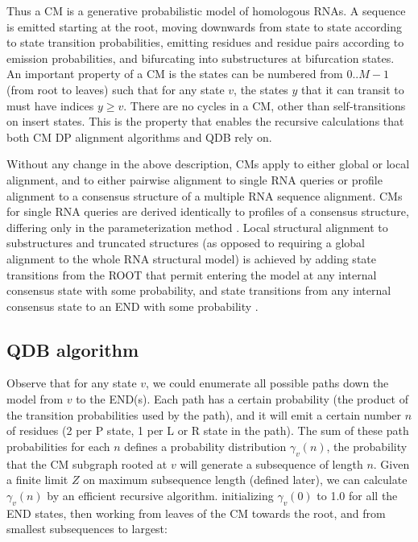 \documentclass[11pt]{article}
\begin{document}
Thus a CM is a generative probabilistic model of homologous RNAs.  A
sequence is emitted starting at the root, moving downwards from state
to state according to state transition probabilities, emitting
residues and residue pairs according to emission probabilities, and
bifurcating into substructures at bifurcation states. An important
property of a CM is the states can be numbered from $0..M-1$ (from root
to leaves) such that for any state $v$, the states $y$ that it can
transit to must have indices $y \geq v$. There are no cycles in a
CM, other than self-transitions on insert states.  This is the
property that enables the recursive calculations that both CM DP
alignment algorithms and QDB rely on.

Without any change in the above description, CMs apply to either
global or local alignment, and to either pairwise alignment to single
RNA queries or profile alignment to a consensus structure of a
multiple RNA sequence alignment. CMs for single RNA queries are
derived identically to profiles of a consensus structure, differing
only in the parameterization method \cite{KleinEddy03}. Local
structural alignment to substructures and truncated structures (as
opposed to requiring a global alignment to the whole RNA structural
model) is achieved by adding state transitions from the ROOT that
permit entering the model at any internal consensus state with some
probability, and state transitions from any internal consensus state 
to an END with some probability \cite{KleinEddy03}.

\subsection{QDB algorithm}

Observe that for any state $v$, we could enumerate all possible paths
down the model from $v$ to the END(s). Each path has a certain
probability (the product of the transition probabilities used by the
path), and it will emit a certain number $n$ of residues (2 per P
state, 1 per L or R state in the path). The sum of these path
probabilities for each $n$ defines a probability distribution
$\gamma_v(n)$, the probability that the CM subgraph rooted at $v$ will
generate a subsequence of length $n$. Given a finite limit $Z$ on
maximum subsequence length (defined later), we can calculate
$\gamma_v(n)$ by an efficient recursive algorithm. initializing
$\gamma_{v}(0)$ to 1.0 for all the END states, then working from
leaves of the CM towards the root, and from smallest subsequences to
largest:
\end{document}
